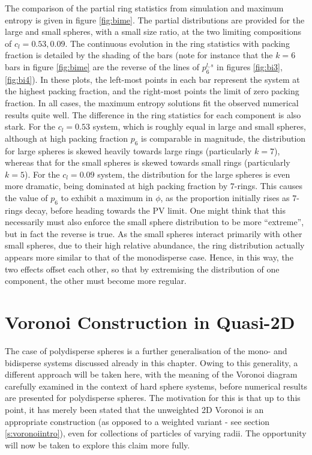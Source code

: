 The comparison of the partial ring statistics from simulation and maximum entropy is given in figure \ref{fig:bime}.
The partial distributions are provided for the large and small spheres, with a small size ratio, at the two limiting compositions of $c_l=0.53,0.09$.
The continuous evolution in the ring statistics with packing fraction is detailed by the shading of the bars (note for instance that the $k=6$ bars in figure \ref{fig:bime} are the reverse of the lines of $p_6^{l,s}$ in figures \ref{fig:bi3}, \ref{fig:bi4}).
In these plots, the left\--most points in each bar represent the system at the highest packing fraction, and the right\--most points the limit of zero packing fraction.
In all cases, the maximum entropy solutions fit the observed numerical results quite well.
The difference in the ring statistics for each component is also stark.
For the $c_l=0.53$ system, which is roughly equal in large and small spheres, although at high packing fraction $p_6$ is comparable in magnitude, the distribution for large spheres is skewed heavily towards large rings (particularly $k=7$), whereas that for the small spheres is skewed towards small rings (particularly $k=5$).
For the $c_l=0.09$ system, the distribution for the large spheres is even more dramatic, being dominated at high packing fraction by $7$\--rings.
This causes the value of $p_6$ to exhibit a maximum in $\phi$, as the proportion initially rises as $7$\--rings decay, before heading towards the PV limit.
One might think that this necessarily must also enforce the small sphere distribution to be more ``extreme'', but in fact the reverse is true.
As the small spheres interact primarily with other small spheres, due to their high relative abundance, the ring distribution actually appears more similar to that of the monodisperse case.
Hence, in this way, the two effects offset each other, so that by extremising the distribution of one component, the other must become more regular.

\section{Voronoi Construction in Quasi\--2D}

The case of \qtd{} polydisperse spheres is a further generalisation of the mono\-- and bidisperse systems discussed already in this chapter.
Owing to this generality, a different approach will be taken here, with the meaning of the Voronoi diagram carefully examined in the context of \qtd{} hard sphere systems, before numerical results are presented for polydisperse spheres.
The motivation for this is that up to this point, it has merely been stated that the unweighted 2D Voronoi is an appropriate construction (as opposed to a weighted variant - see section \ref{s:voronoiintro}), even for collections of particles of varying radii.
The opportunity will now be taken to explore this claim more fully.

